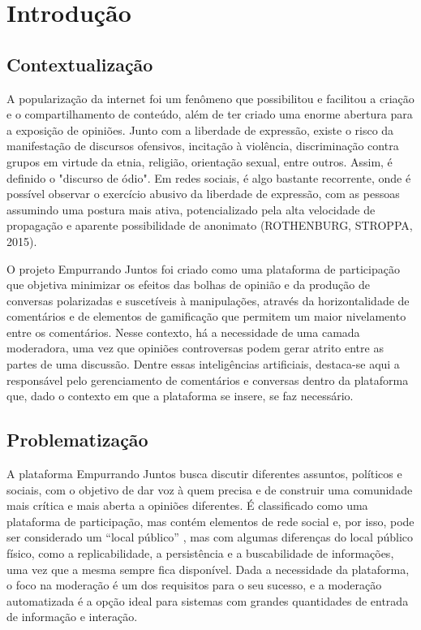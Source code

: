 \chapter[Introdução]{Introdução}
\section[Contextualização]{Contextualização}

A popularização da internet foi um fenômeno que possibilitou e facilitou a criação e o compartilhamento de conteúdo, além de ter criado uma enorme abertura para a exposição de opiniões. Junto com a liberdade de expressão, existe o risco da manifestação de discursos ofensivos, incitação à violência, discriminação contra grupos em virtude da etnia, religião, orientação sexual, entre outros. Assim, é definido o "discurso de ódio". Em redes sociais, é algo bastante recorrente, onde é possível observar o exercício abusivo da liberdade de expressão, com as pessoas assumindo uma postura mais ativa, potencializado pela alta velocidade de propagação e aparente possibilidade de anonimato (ROTHENBURG, STROPPA, 2015). 

O projeto Empurrando Juntos foi criado como uma plataforma de participação que objetiva minimizar os efeitos das bolhas de opinião e da produção de conversas polarizadas e suscetíveis à manipulações, através da horizontalidade de comentários e de elementos de gamificação que permitem um maior nivelamento entre os comentários. Nesse contexto, há a necessidade de uma camada moderadora, uma vez que opiniões controversas podem gerar atrito entre as partes de uma discussão. Dentre essas inteligências artificiais, destaca-se aqui a responsável pelo gerenciamento de comentários e conversas dentro da plataforma que, dado o contexto em que a plataforma se insere, se faz necessário.

\section[Problematização]{Problematização}


A plataforma Empurrando Juntos busca discutir diferentes assuntos, políticos e sociais, com o objetivo de dar voz à quem precisa e de construir uma comunidade mais crítica e mais aberta a opiniões diferentes. É classificado como uma plataforma de participação, mas contém elementos de rede social e, por isso, pode ser considerado um “local público” \cite{haterrebs}, mas com algumas diferenças do local público físico, como a replicabilidade, a persistência e a buscabilidade de informações, uma vez que a mesma sempre fica disponível. Dada a necessidade da plataforma, o foco na moderação é um dos requisitos para o seu sucesso, e a moderação automatizada é a opção ideal para sistemas com grandes quantidades de entrada de informação e interação.


